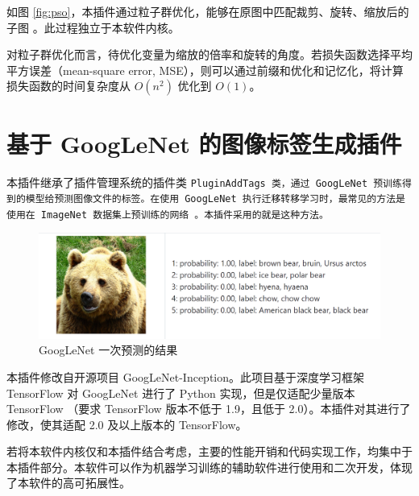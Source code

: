 如图 \ref{fig:pso}，本插件通过粒子群优化，能够在原图中匹配裁剪、旋转、缩放后的子图 \cite{git_pso}。此过程独立于本软件内核。

对粒子群优化而言，待优化变量为缩放的倍率和旋转的角度。若损失函数选择平均平方误差（mean-square error, MSE），则可以通过前缀和优化和记忆化，将计算损失函数的时间复杂度从 $O(n^2)$ 优化到 $O(1)$。

\section{基于 GoogLeNet 的图像标签生成插件}

本插件继承了插件管理系统的插件类 \tt{PluginAddTags} 类，通过 GoogLeNet 预训练得到的模型给预测图像文件的标签。在使用 GoogLeNet 执行迁移转移学习时，最常见的方法是使用在 ImageNet 数据集上预训练的网络 \cite{ggnet2}。本插件采用的就是这种方法。

\begin{figure}[h]
    \centering
    \includegraphics[width=\textwidth]{figures/ggnet.png}
    \caption{GoogLeNet 一次预测的结果}
    \label{fig:ggnet}
\end{figure}

本插件修改自开源项目 GoogLeNet-Inception。此项目基于深度学习框架 TensorFlow 对 GoogLeNet 进行了 Python 实现，但是仅适配少量版本 TensorFlow （要求 TensorFlow 版本不低于 1.9，且低于 2.0）\cite{git_ggnet}。本插件对其进行了修改，使其适配 2.0 及以上版本的 TensorFlow。

若将本软件内核仅和本插件结合考虑，主要的性能开销和代码实现工作，均集中于本插件部分。本软件可以作为机器学习训练的辅助软件进行使用和二次开发，体现了本软件的高可拓展性。
